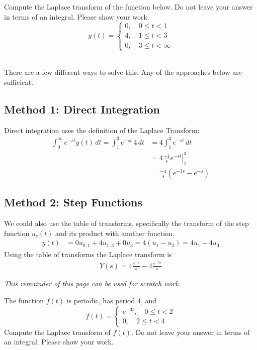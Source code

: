 \ifnum {}
\question[2] 
Compute the Laplace transform of the function below. Do not leave your answer in terms of an integral. Please show your work. 
$$y(t) = \begin{cases} 0, \quad 0 \le t < 1 \\ 4, \quad 1 \le t < 3 \\ 0, \quad 3 \le t < \infty\end{cases}$$
\ifnum {} {\color{DarkBlue} \\[12pt] 
There are a few different ways to solve this. Any of the approaches below are sufficient. 
\subsection*{Method 1: Direct Integration }
Direct integration uses the definition of the Laplace Transform:
    \begin{align}
        \int_0^{\infty} e^{-st} y(t) \, dt 
        = \int_1^{3} e^{-st} \, 4 \, dt 
        &= 4\int_1^{3} e^{-st}  \, dt  \\         
        &= 4\left.\frac{-1}{s} e^{-st} \right|_1^3  \\         
        &= \frac{-4}{s} \left(e^{-3s}  - e^{-s} \right)     
    \end{align}
    \subsection*{Method 2: Step Functions}
    We could also use the table of transforms, specifically the transform of the step function $u_c(t)$ and its product with another function. 
    \begin{align}
        y(t) &= 0u_{0,1} + 4u_{1,3} + 0u_{3} 
        =4(u_1-u_3) 
        = 4u_1 - 4 u_3 
    \end{align}   
    Using the table of transforms the Laplace transform is
    \begin{align}
        Y(s) = 4 \frac{e^{-s}}{s} - 4\frac{e^{-3s}}{s}
    \end{align}
    \newpage
} 
\else 
    \vfill
    \begin{center}
        \textit{This remainder of this page can be used for scratch work. }
    \end{center}
    \vfill
\fi
\fi







\ifnum {}
\question[3] 
The function $f(t)$ is periodic, has period $4$, and 
        $$f(t) = \begin{cases} e^{-3t}, \quad 0 \le t < 2 \\ 0, \quad 2 \le t < 4 \end{cases}$$
        Compute the Laplace transform of $f(t)$. Do not leave your answer in terms of an integral. Please show your work. 

